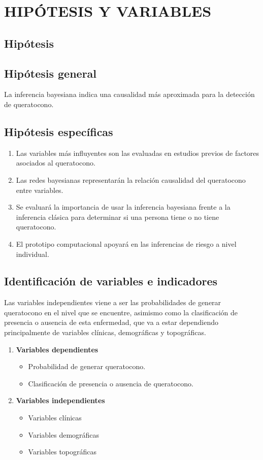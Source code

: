 \newpage
\chapter{HIPÓTESIS Y VARIABLES}
\section{Hipótesis}

\section{Hipótesis general}
La inferencia bayesiana indica una causalidad más aproximada para la detección de queratocono.

\section{Hipótesis específicas}

\begin{enumerate}
    \item Las variables más influyentes son las evaluadas en estudios previos de factores asociados al queratocono.
    \item Las redes bayesianas representarán la relación causalidad del queratocono entre variables.
    \item Se evaluará la importancia de usar la inferencia bayesiana frente a la inferencia clásica para determinar si una persona tiene o no tiene queratocono.
    \item El prototipo computacional apoyará en las inferencias de riesgo a nivel individual.
\end{enumerate}

\section{Identificación de variables e indicadores}

Las variables independientes viene a ser las probabilidades de generar queratocono en el nivel que se encuentre, asimismo como la clasificación de presencia o ausencia de esta enfermedad, que va a estar dependiendo principalmente de variables clínicas, demográficas y topográficas.

\begin{enumerate}
    \item \textbf{Variables dependientes}
    \begin{itemize}
        \item Probabilidad de generar queratocono.
        \item Clasificación de presencia o ausencia de queratocono. 
    \end{itemize}
    \item \textbf{Variables independientes} 
    \begin{itemize}
        \item Variables clínicas
        \item Variables demográficas
        \item Variables topográficas 
    \end{itemize}
\end{enumerate}

